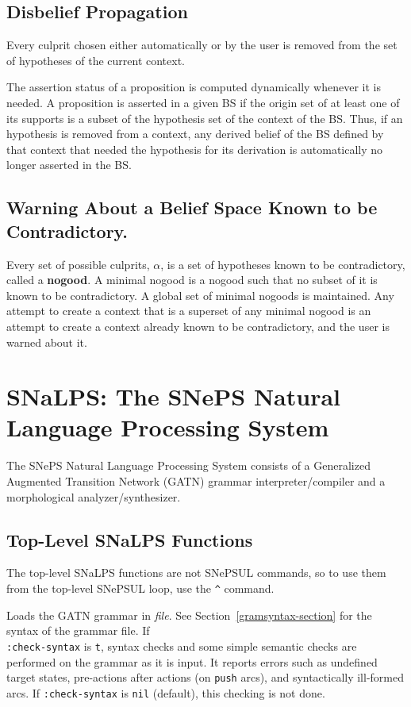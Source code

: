 \documentclass{book}
\makeatletter
\newcommand{\ct}[1]{{\ttfamily #1}} %
\newcommand{\indexct}[1]{\index{#1@\ct{#1}}} %
\newcommand{\docfun}[2]{\vspace{3ex}\par\noindent\ct{(#1
#2)}\indexct{#1}\newline}
\makeatother
\begin{document}
\section{Disbelief Propagation}
Every culprit chosen either automatically or by the user is removed
from the set of hypotheses of the current context.

The assertion status of a proposition is computed dynamically whenever
it is needed.  A proposition is asserted in a given BS if the origin
set of at least one of its supports is a subset of the hypothesis set
of the context of the BS.  Thus, if an hypothesis is removed from a
context, any derived belief of the BS defined by that context that
needed the hypothesis for its derivation is automatically no longer
asserted in the BS.

\section{Warning About a Belief Space Known to be Contradictory.}

Every set of possible culprits, $\alpha$, is a set of hypotheses known to be
contradictory, called a \textbf{nogood}.  A minimal nogood is a
nogood such that no subset of it is known to be contradictory.  A global set of
minimal nogoods is maintained.  Any attempt to create a context that is a
superset of any minimal nogood is an attempt to create a context already known
to be contradictory, and the user is warned about it.

\chapter{SNaLPS:  The SNePS Natural Language Processing
System}\label{snalpschap}

The SNePS Natural Language Processing System consists of a Generalized Augmented Transition Network
(GATN) grammar interpreter/compiler and a morphological analyzer/synthesizer.

\section{Top-Level SNaLPS Functions}

The top-level SNaLPS functions are not SNePSUL commands, so to use
them from the top-level SNePSUL loop, use the \verb|^| command.

\docfun{atnin}{{\it file} \&key :check-syntax} Loads the GATN grammar
in {\it file}.  See Section~\ref{gramsyntax-section} for the syntax of
the grammar file.  If\\ {\tt :check-syntax} is {\tt t}, syntax checks
and some simple semantic checks are performed on the grammar as it is
input. It reports errors such as undefined target states, pre-actions
after actions (on {\tt push} arcs), and syntactically ill-formed arcs.
If {\tt :check-syntax} is {\tt nil} (default), this checking is not
done.
\end{document}
